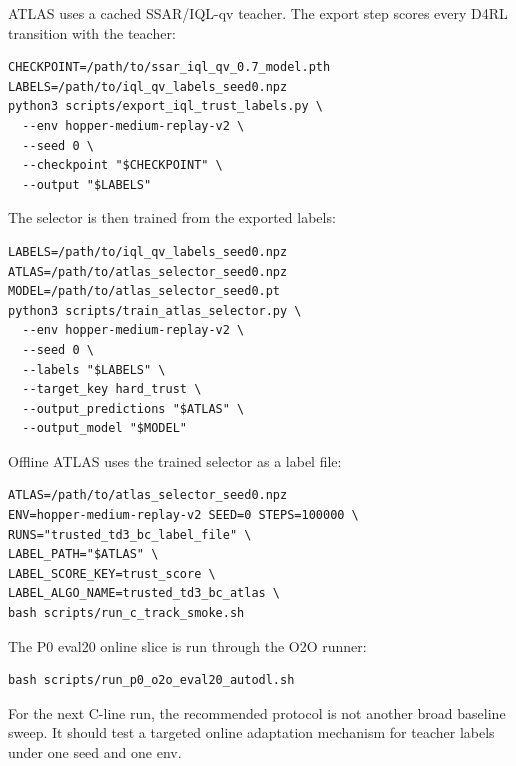 ATLAS uses a cached SSAR/IQL-qv teacher. The export step scores every D4RL transition with the teacher:

\begin{verbatim}
CHECKPOINT=/path/to/ssar_iql_qv_0.7_model.pth
LABELS=/path/to/iql_qv_labels_seed0.npz
python3 scripts/export_iql_trust_labels.py \
  --env hopper-medium-replay-v2 \
  --seed 0 \
  --checkpoint "$CHECKPOINT" \
  --output "$LABELS"
\end{verbatim}

The selector is then trained from the exported labels:

\begin{verbatim}
LABELS=/path/to/iql_qv_labels_seed0.npz
ATLAS=/path/to/atlas_selector_seed0.npz
MODEL=/path/to/atlas_selector_seed0.pt
python3 scripts/train_atlas_selector.py \
  --env hopper-medium-replay-v2 \
  --seed 0 \
  --labels "$LABELS" \
  --target_key hard_trust \
  --output_predictions "$ATLAS" \
  --output_model "$MODEL"
\end{verbatim}

Offline ATLAS uses the trained selector as a label file:

\begin{verbatim}
ATLAS=/path/to/atlas_selector_seed0.npz
ENV=hopper-medium-replay-v2 SEED=0 STEPS=100000 \
RUNS="trusted_td3_bc_label_file" \
LABEL_PATH="$ATLAS" \
LABEL_SCORE_KEY=trust_score \
LABEL_ALGO_NAME=trusted_td3_bc_atlas \
bash scripts/run_c_track_smoke.sh
\end{verbatim}

The P0 eval20 online slice is run through the O2O runner:

\begin{verbatim}
bash scripts/run_p0_o2o_eval20_autodl.sh
\end{verbatim}

For the next C-line run, the recommended protocol is not another broad baseline sweep. It should test a targeted online adaptation mechanism for teacher labels under one seed and one env.


